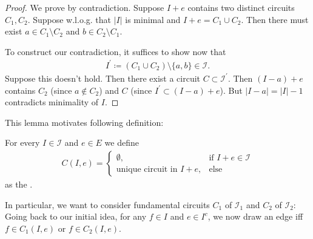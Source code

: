 \begin{proof}
    We prove by contradiction. Suppose $I+e$ contains two distinct circuits $C_1,C_2$.
    Suppose w.l.o.g. that $|I|$ is minimal and $I + e = C_1 \cup C_2$.
    Then there must exist $a \in C_1 \setminus C_2$ and $b \in C_2 \setminus C_1$.

    To construct our contradiction, it suffices to show now that
    \begin{align*}
        I^\prime \coloneqq (C_1 \cup C_2)\setminus \{a,b\} \in \mathcal I.
    \end{align*}
    Suppose this doesn't hold. Then there exist a circuit $C \subset \mathcal I^\prime$.
    Then $(I - a) + e$ contains $C_2$ (since $a \not \in C_2$) and $C$
    (since $I^\prime \subset (I-a)+e$). But $|I-a|=|I|-1$ contradicts minimality of $I$.
\end{proof}
This lemma motivates following definition:
\begin{definition}
    For every $I \in \mathcal{I}$ and $e \in E$ we define
    \begin{align*}
        C(I,e)=\begin{cases}
                   \emptyset,                     & \text{if } I + e \in \mathcal I \\
                   \text{unique circuit in } I+e, & \text{else}
               \end{cases}
    \end{align*}
    as the .
\end{definition}
In particular, we want to consider fundamental circuits $C_1$ of $\mathcal I_1$ and $C_2$ of $\mathcal I_2$:
Going back to our initial idea, for any $f \in I$ and $e \in I^c$, we now draw an edge iff $f \in C_1(I,e)$ or $f \in C_2(I,e)$.
